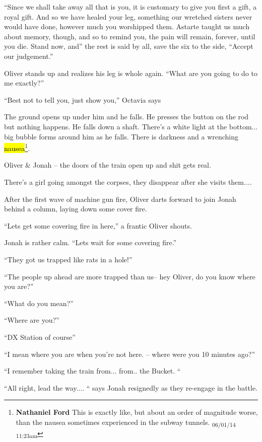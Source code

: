 ``Since we shall take away all that is you, it is customary to give you first a gift, a royal gift. And so we have healed your leg, something our wretched sisters never would have done, however much you worshipped them. Astarte taught us much about memory, though, and so to remind you, the pain will remain, forever, until you die. Stand now, and'' the rest is said by all, save the six to the side, ``Accept our judgement.''

Oliver stands up and realizes his leg is whole again. ``What are you going to do to me exactly?''

``Best not to tell you, just show you,'' Octavia says



The ground opens up under him and he falls.  He presses the button on the rod but nothing happens.  He falls down a shaft.  There's a white light at the bottom... big bubble forms around him as he falls.  There is darkness and a wrenching \hl{nausea}\footnote{\textbf{Nathaniel Ford }This is exactly like, but about an order of magnitude worse, than the nausea sometimes experienced in the subway tunnels. \textsubscript{06/01/14 11:23am}}.



Oliver \& Jonah -- the doors of the train open up and shit gets real.  

There's a girl going amongst the corpses, they disappear after she visits them.... 

After the first wave of machine gun fire, Oliver darts forward to join Jonah behind a column, laying down some cover fire. 

``Lets get some covering fire in here,'' a frantic Oliver shouts.

Jonah is rather calm. ``Lets wait for some covering fire.''

``They got us trapped like rats in a hole!''

``The people up ahead are more trapped than us-- hey Oliver, do you know where you are?''

``What do you mean?''

``Where are you?''

``DX Station of course''

``I mean where you are when you're not here. -- where were you 10 minutes ago?''

``I remember taking the train from... from.. the Bucket. ``

``All right, lead the way.... `` says Jonah resignedly as they re-engage in the battle.

